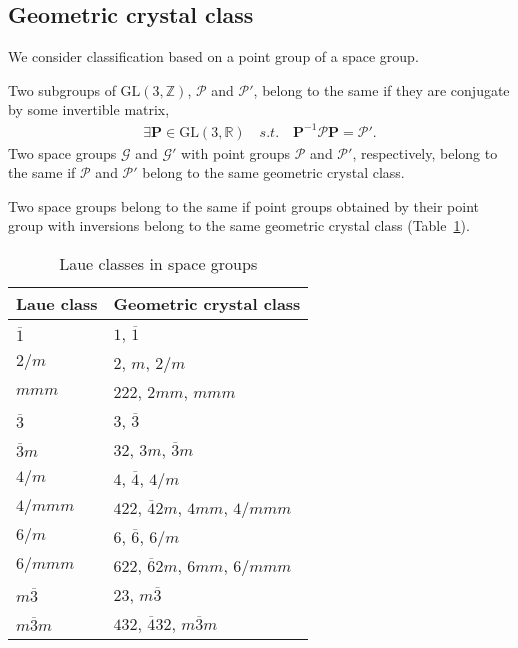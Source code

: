 \subsection{\label{sec:geometric-class}Geometric crystal class}

We consider classification based on a point group of a space group.

\begin{screen}
  \begin{defn}
    Two subgroups of $\mathrm{GL}(3, \mathbb{Z})$, $\mathcal{P}$ and $\mathcal{P}'$, belong to the same  if they are conjugate by some invertible matrix,
    \begin{align}
      \exists \bm{P} \in \mathrm{GL}(3, \mathbb{R}) \quad s.t. \quad \bm{P}^{-1} \mathcal{P} \bm{P} = \mathcal{P}'.
    \end{align}
    Two space groups $\mathcal{G}$ and $\mathcal{G}'$ with point groups $\mathcal{P}$ and $\mathcal{P}'$, respectively, belong to the same  if $\mathcal{P}$ and $\mathcal{P}'$ belong to the same geometric crystal class.
  \end{defn}
\end{screen}

Two space groups belong to the same  if point groups obtained by their point group with inversions belong to the same geometric crystal class (Table~\ref{tab:laue_class}).

\begin{table}[tb]
  \centering
  \caption{Laue classes in space groups}
  \label{tab:laue_class}
  \begin{tabular}[h]{l|l}
    \hline
    Laue class       & Geometric crystal class \\ \hline
    $\overline{1}$   & $1$, $\overline{1}$ \\
    $2/m$            & $2$, $m$, $2/m$ \\
    $mmm$            & $222$, $2mm$, $mmm$ \\
    $\overline{3}$   & $3$, $\overline{3}$ \\
    $\overline{3}m$  & $32$, $3m$, $\overline{3}m$ \\
    $4/m$            & $4$, $\overline{4}$, $4/m$ \\
    $4/mmm$          & $422$, $\overline{4}2m$, $4mm$, $4/mmm$ \\
    $6/m$            & $6$, $\overline{6}$, $6/m$ \\
    $6/mmm$          & $622$, $\overline{6}2m$, $6mm$, $6/mmm$ \\
    $m\overline{3}$  & $23$, $m\overline{3}$ \\
    $m\overline{3}m$ & $432$, $\overline{4}32$, $m\overline{3}m$ \\ \hline
  \end{tabular}
\end{table}

